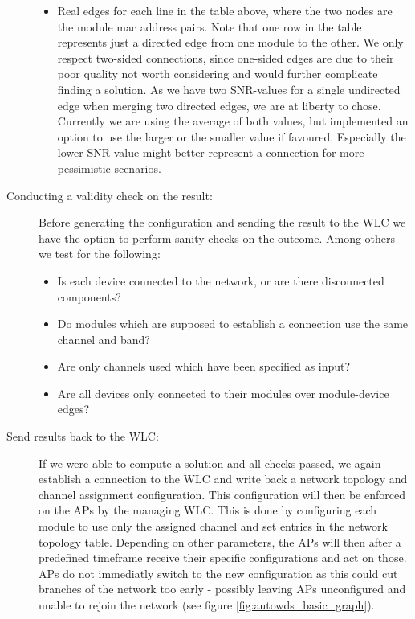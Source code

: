 \begin{description}
\begin{itemize}
	    \item Real edges for each line in the table above, where the two nodes are the module mac address pairs. 
	      Note that one row in the table represents just a directed edge from one module to the other. 
	      We only respect two-sided connections, since one-sided edges are due to their poor quality not worth considering and would further complicate finding a solution.
	      As we have two \ac{SNR}-values for a single undirected edge when merging two directed edges, we are at liberty to chose.
	      Currently we are using the average of both values, but implemented an option to use the larger or the smaller value if favoured.
	      Especially the lower \ac{SNR} value might better represent a connection for more pessimistic scenarios.
	  \end{itemize}

	\item[Conducting a validity check on the result:\newline]
	  Before generating the configuration and sending the result to the \ac{WLC} we have the option to perform sanity checks on the outcome.
	  Among others we test for the following:
	  \begin{itemize}
	    \item Is each device connected to the network, or are there disconnected components?
	    \item Do modules which are supposed to establish a connection use the same channel and band?
	    \item Are only channels used which have been specified as input?
	    \item Are all devices only connected to their modules over module-device edges?
	  \end{itemize}
	  
	\item [Send results back to the \ac{WLC}:]
	  If we were able to compute a solution and all checks passed, we again establish a connection to the \ac{WLC} and write back a network topology and channel assignment
	  configuration. This configuration will then be enforced on the APs by the managing \ac{WLC}.
	  This is done by configuring each module to use only the assigned channel and set entries in the network topology table. 
	  Depending on other parameters, the APs will then after a predefined timeframe receive their specific configurations and act on those.
	  APs do not immediatly switch to the new configuration as this could cut branches of the network too early - possibly leaving APs 
	  unconfigured and unable to rejoin the network (see figure \ref{fig:autowds_basic_graph}).
	  
      \end{description}
      
